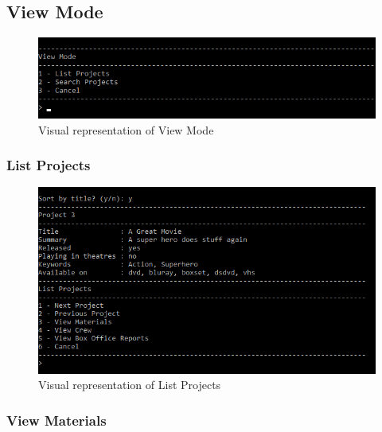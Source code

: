 \documentclass[
  english,
  a4paper,
,tablecaptionabove
]{scrartcl}
\begin{document}
\newpage

\hypertarget{view-mode}{%
\subsection{View Mode}\label{view-mode}}

\begin{figure}
\centering
\includegraphics{images/ui-screenshots/view-mode.png}
\caption{Visual representation of View Mode}
\end{figure}

\newpage

\hypertarget{list-projects}{%
\subsubsection{List Projects}\label{list-projects}}

\begin{figure}
\centering
\includegraphics{images/ui-screenshots/list-projects.png}
\caption{Visual representation of List Projects}
\end{figure}

\hypertarget{view-materials}{%
\subsubsection{View Materials}\label{view-materials}}
\end{document}
